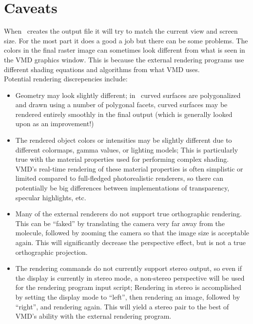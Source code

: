 \section{Caveats}

When \VMD\ creates the output file it will try to match the current
view and screen size.  For the most part it does a good a job but
there can be some problems.  The colors in the final raster image can 
sometimes look different from what is seen in the VMD graphics window.
This is because the external rendering programs use different shading
equations and algorithms from what VMD uses.
\\
Potential rendering discrepencies include:
\begin{itemize}
  \item Geometry may look slightly different; 
        in \VMD\ curved surfaces are polygonalized and drawn using a
        number of polygonal facets, curved surfaces may be rendered entirely
        smoothly in the final output (which is generally looked upon as an
        improvement!)
  \item The rendered object colors or intensities may be slightly different
        due to different colormaps, gamma values, or lighting models;
        This is particularly true with the material properties used for
        performing complex shading.  VMD's real-time rendering of these
        material properties is often simplistic or limited compared to
        full-fledged photorealistic renderers, so there can potentially
        be big differences between implementations of transparency,
        specular highlights, etc.
  \item Many of the external renderers do not support true orthographic
        rendering.  This can be ``faked'' by translating the camera
        very far away from the molecule, followed by zooming the camera
        so that the image size is acceptable again.  This will significantly
        decrease the perspective effect, but is not a true orthographic
        projection.
  \item The rendering commands do not currently support stereo output,
        so even if the display is currently in stereo mode, a non-stereo
        perspective will be used for the rendering program input script;
        Rendering in stereo is accomplished by setting the display mode
        to ``left'', then rendering an image, followed by ``right'', and
        rendering again.  This will yield a stereo pair to the best of
        VMD's ability with the external rendering program.

\end{itemize}

